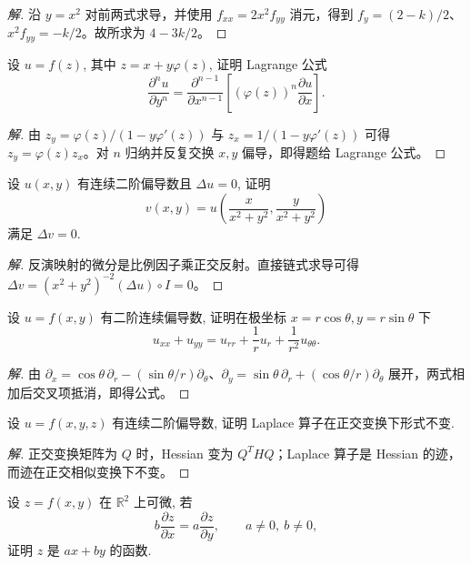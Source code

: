 \documentclass[../../数学分析培优讲义(答案版).tex]{subfiles}
\begin{document}
\begin{proof}[解]
沿 $y=x^2$ 对前两式求导，并使用 $f_{xx}=2x^2f_{yy}$ 消元，得到 $f_y=(2-k)/2$、$x^2f_{yy}=-k/2$。故所求为 $4-3k/2$。
\end{proof}

\begin{example}
设 $u=f(z)$, 其中 $z=x+y\varphi(z)$, 证明 Lagrange 公式
\[
    \dfrac{\partial^nu}{\partial y^n}
    =\dfrac{\partial^{n-1}}{\partial x^{n-1}}
    \left[(\varphi(z))^n\dfrac{\partial u}{\partial x}\right].
\]
\end{example}

\begin{proof}[解]
由 $z_y=\varphi(z)/(1-y\varphi'(z))$ 与 $z_x=1/(1-y\varphi'(z))$ 可得 $z_y=\varphi(z)z_x$。对 $n$ 归纳并反复交换 $x,y$ 偏导，即得题给 Lagrange 公式。
\end{proof}

\begin{example}
设 $u(x,y)$ 有连续二阶偏导数且 $\Delta u=0$, 证明
\[
    v(x,y)=u\left(\dfrac{x}{x^2+y^2},\dfrac{y}{x^2+y^2}\right)
\]
满足 $\Delta v=0$.
\end{example}

\begin{proof}[解]
反演映射的微分是比例因子乘正交反射。直接链式求导可得
$\Delta v=(x^2+y^2)^{-2}(\Delta u)\circ I=0$。
\end{proof}

\begin{example}
设 $u=f(x,y)$ 有二阶连续偏导数, 证明在极坐标 $x=r\cos\theta,y=r\sin\theta$ 下
\[
    u_{xx}+u_{yy}=u_{rr}+\dfrac{1}{r}u_r+\dfrac{1}{r^2}u_{\theta\theta}.
\]
\end{example}

\begin{proof}[解]
由 $\partial_x=\cos\theta\,\partial_r-(\sin\theta/r)\partial_\theta$、$\partial_y=\sin\theta\,\partial_r+(\cos\theta/r)\partial_\theta$ 展开，两式相加后交叉项抵消，即得公式。
\end{proof}

\begin{example}
设 $u=f(x,y,z)$ 有连续二阶偏导数, 证明 Laplace 算子在正交变换下形式不变.
\end{example}

\begin{proof}[解]
正交变换矩阵为 $Q$ 时，Hessian 变为 $Q^THQ$；Laplace 算子是 Hessian 的迹，而迹在正交相似变换下不变。
\end{proof}

\begin{example}
设 $z=f(x,y)$ 在 $\mathbb{R}^2$ 上可微, 若
\[
    b\dfrac{\partial z}{\partial x}=a\dfrac{\partial z}{\partial y},
    \qquad a\ne0,\ b\ne0,
\]
证明 $z$ 是 $ax+by$ 的函数.
\end{example}
\end{document}
